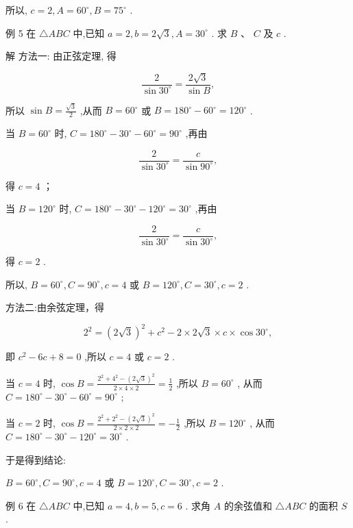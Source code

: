 \documentclass[10pt]{article}
\begin{document}
所以, \(c = 2,A = {60}^{ \circ  },B = {75}^{ \circ  }\) .

例 5 在 \(\bigtriangleup {ABC}\) 中,已知 \(a = 2,b = 2\sqrt{3},A = {30}^{ \circ  }\) . 求 \(B\text{ 、 }C\) 及 \(c\) .

解 方法一: 由正弦定理, 得

\[
\frac{2}{\sin {30}^{ \circ  }} = \frac{2\sqrt{3}}{\sin B},
\]

所以 \(\sin B = \frac{\sqrt{3}}{2}\) ,从而 \(B = {60}^{ \circ  }\) 或 \(B = {180}^{ \circ  } - {60}^{ \circ  } = {120}^{ \circ  }\) .

当 \(B = {60}^{ \circ  }\) 时, \(C = {180}^{ \circ  } - {30}^{ \circ  } - {60}^{ \circ  } = {90}^{ \circ  }\) ,再由

\[
\frac{2}{\sin {30}^{ \circ  }} = \frac{c}{\sin {90}^{ \circ  }},
\]

得 \(c = 4\) ；

当 \(B = {120}^{ \circ  }\) 时, \(C = {180}^{ \circ  } - {30}^{ \circ  } - {120}^{ \circ  } = {30}^{ \circ  }\) ,再由

\[
\frac{2}{\sin {30}^{ \circ  }} = \frac{c}{\sin {30}^{ \circ  }},
\]

得 \(c = 2\) .

所以, \(B = {60}^{ \circ  },C = {90}^{ \circ  },c = 4\) 或 \(B = {120}^{ \circ  },C = {30}^{ \circ  },c = 2\) .

方法二:由余弦定理，得

\[
{2}^{2} = {\left( 2\sqrt{3}\right) }^{2} + {c}^{2} - 2 \times  2\sqrt{3} \times  c \times  \cos {30}^{ \circ  },
\]

即 \({c}^{2} - {6c} + 8 = 0\) ,所以 \(c = 4\) 或 \(c = 2\) .

当 \(c = 4\) 时, \(\cos B = \frac{{2}^{2} + {4}^{2} - {\left( 2\sqrt{3}\right) }^{2}}{2 \times  4 \times  2} = \frac{1}{2}\) ,所以 \(B = {60}^{ \circ  }\) , 从而 \(C = {180}^{ \circ  } - {30}^{ \circ  } - {60}^{ \circ  } = {90}^{ \circ  }\) ;

当 \(c = 2\) 时, \(\cos B = \frac{{2}^{2} + {2}^{2} - {\left( 2\sqrt{3}\right) }^{2}}{2 \times  2 \times  2} =  - \frac{1}{2}\) ,所以 \(B = {120}^{ \circ  }\) , 从而 \(C = {180}^{ \circ  } - {30}^{ \circ  } - {120}^{ \circ  } = {30}^{ \circ  }\) .

于是得到结论:

\(B = {60}^{ \circ  },C = {90}^{ \circ  },c = 4\) 或 \(B = {120}^{ \circ  },C = {30}^{ \circ  },c = 2\) .

例 6 在 \(\bigtriangleup {ABC}\) 中,已知 \(a = 4,b = 5,c = 6\) . 求角 \(A\) 的余弦值和 \(\bigtriangleup {ABC}\) 的面积 \(S\) .
\end{document}
